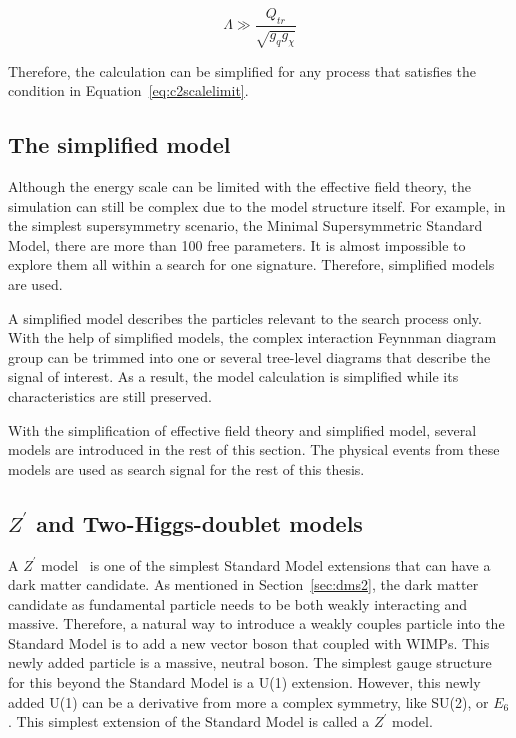 \begin{equation}
  \Lambda \gg \frac{Q_{tr}}{\sqrt{g_{q}g_{\chi}}}
  \label{eq:c2scalelimit}
\end{equation}

Therefore, the calculation can be simplified for any process that satisfies the condition in Equation~\ref{eq:c2scalelimit}.

\subsection{The simplified model}
\par Although the energy scale can be limited with the effective field theory, the simulation can still be complex due to the model structure itself. For example, in the simplest supersymmetry scenario, the Minimal Supersymmetric Standard Model, there are more than 100 free parameters. It is almost impossible to explore them all within a search for one signature. Therefore, simplified models~\cite{SimplifiedModels-Alves2012} are used.

\par A simplified model describes the particles relevant to the search process only. With the help of simplified models, the complex interaction Feynnman diagram group can be trimmed into one or several tree-level diagrams that describe the signal of interest. As a result, the model calculation is simplified while its characteristics are still preserved. 

\par With the simplification of effective field theory and simplified model, several models are introduced in the rest of this section. The physical events from these models are used as search signal for the rest of this thesis.

\subsection{$Z^{\prime}$ and Two-Higgs-doublet models}
\par A $Z^{\prime}$ model~\cite{He:1991qd} is one of the simplest Standard Model extensions that can have a dark matter candidate. As mentioned in Section~\ref{sec:dms2}, the dark matter candidate as fundamental particle needs to be both weakly interacting and massive. Therefore, a natural way to introduce a weakly couples particle into the Standard Model is to add a new vector boson that coupled with WIMPs. This newly added particle is a massive, neutral boson. The simplest gauge structure for this beyond the Standard Model is a U(1) extension. However, this newly added U(1) can be a derivative from more a complex symmetry, like SU(2), or $E_{6}$. This simplest extension of the Standard Model is called a $Z^{\prime}$ model.

